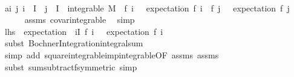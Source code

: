 \begin{isabellebody}
%
\isadelimproof
%
\endisadelimproof
%
\isatagproof
{}\isamarkupfalse%
\ {\isacharminus}{\kern0pt}\isanewline
\ \ \isamarkupfalse%
\ a{\isacharcolon}{\kern0pt}{\isachardoublequoteopen}{\isasymAnd}i\ j{\isachardot}{\kern0pt}\ i\ {\isasymin}\ I\ {\isasymLongrightarrow}\ j\ {\isasymin}\ I\ {\isasymLongrightarrow}\ integrable\ M\ {\isacharparenleft}{\kern0pt}{\isasymlambda}{\isasymomega}{\isachardot}{\kern0pt}\ {\isacharparenleft}{\kern0pt}f\ i\ {\isasymomega}\ {\isacharminus}{\kern0pt}\ expectation\ {\isacharparenleft}{\kern0pt}f\ i{\isacharparenright}{\kern0pt}{\isacharparenright}{\kern0pt}\ {\isacharasterisk}{\kern0pt}\ {\isacharparenleft}{\kern0pt}f\ j\ {\isasymomega}\ {\isacharminus}{\kern0pt}\ expectation\ {\isacharparenleft}{\kern0pt}f\ j{\isacharparenright}{\kern0pt}{\isacharparenright}{\kern0pt}{\isacharparenright}{\kern0pt}{\isachardoublequoteclose}\ \isanewline
\ \ \ \ \isamarkupfalse%
\ assms\ covar{\isacharunderscore}{\kern0pt}integrable\ \isamarkupfalse%
\ simp\isanewline
\ \ \isamarkupfalse%
\ {\isachardoublequoteopen}{\isacharquery}{\kern0pt}lhs\ {\isacharequal}{\kern0pt}\ expectation\ {\isacharparenleft}{\kern0pt}{\isasymlambda}{\isasymomega}{\isachardot}{\kern0pt}\ {\isacharparenleft}{\kern0pt}{\isasymSum}i{\isasymin}I{\isachardot}{\kern0pt}\ f\ i\ {\isasymomega}\ {\isacharminus}{\kern0pt}\ expectation\ {\isacharparenleft}{\kern0pt}f\ i{\isacharparenright}{\kern0pt}{\isacharparenright}{\kern0pt}\isanewline
\ \ \ \ \isamarkupfalse%
\ {\isacharparenleft}{\kern0pt}subst\ Bochner{\isacharunderscore}{\kern0pt}Integration{\isachardot}{\kern0pt}integral{\isacharunderscore}{\kern0pt}sum{\isacharparenright}{\kern0pt}\isanewline
\ \ \ \ \isamarkupfalse%
\ {\isacharparenleft}{\kern0pt}simp\ add{\isacharcolon}{\kern0pt}\ square{\isacharunderscore}{\kern0pt}integrable{\isacharunderscore}{\kern0pt}imp{\isacharunderscore}{\kern0pt}integrable{\isacharbrackleft}{\kern0pt}OF\ assms{\isacharparenleft}{\kern0pt}{}{\isacharparenright}{\kern0pt}\ assms{\isacharparenleft}{\kern0pt}{}{\isacharparenright}{\kern0pt}{\isacharbrackright}{\kern0pt}{\isacharparenright}{\kern0pt}\isanewline
\ \ \ \ \isamarkupfalse%
\ {\isacharparenleft}{\kern0pt}subst\ sum{\isacharunderscore}{\kern0pt}subtractf{\isacharbrackleft}{\kern0pt}symmetric{\isacharbrackright}{\kern0pt}{\isacharcomma}{\kern0pt}\ simp{\isacharparenright}{\kern0pt}\isanewline
\ \ \isamarkupfalse%

\end{isabellebody}
